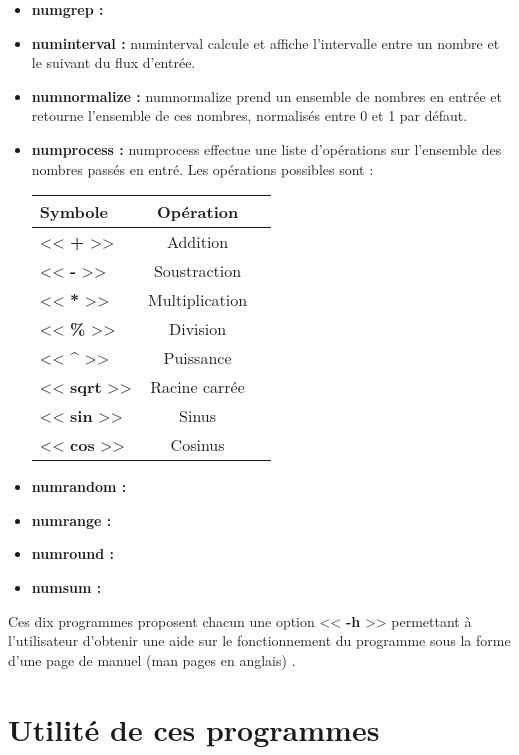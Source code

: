\begin{itemize}
 \item[\textbullet] \textbf{numgrep :} 
 \newline
 \item[\textbullet] \textbf{numinterval :} numinterval calcule et affiche l'intervalle entre un nombre et le suivant du flux d'entr\'ee. 
 \newline
 \item[\textbullet] \textbf{numnormalize :} numnormalize prend un ensemble de nombres en entr\'ee et retourne l'ensemble de ces nombres, 
normalis\'es entre 0 et 1 par d\'efaut.
 \newline
 \item[\textbullet] \textbf{numprocess :} numprocess effectue une liste d'op\'erations sur l'ensemble des nombres pass\'es en entr\'e.
Les op\'erations possibles sont :
\newline
\newline
\begin{tabular}{|l|c|r|}
  \hline
  Symbole &  Op\'eration\\
  \hline
  << \textbf{+} >> & Addition \\
  << \textbf{-} >> & Soustraction \\
  << \textbf{*} >> & Multiplication \\
  << \textbf{\%} >> & Division \\
  << \textbf{\^} >> & Puissance \\
  << \textbf{sqrt} >> & Racine carr\'ee \\
  << \textbf{sin} >> & Sinus \\
  << \textbf{cos} >> & Cosinus \\
  \hline
\end{tabular}
\newline
 \item[\textbullet] \textbf{numrandom :}
 \newline
 \item[\textbullet] \textbf{numrange :}
 \newline
 \item[\textbullet] \textbf{numround :}
 \newline
 \item[\textbullet] \textbf{numsum :}
 \newline
\end{itemize}

Ces dix programmes proposent chacun une option << \textbf{-h} >> permettant \`a l'utilisateur d'obtenir une aide sur le fonctionnement du 
programme sous la forme d'une page de manuel (man pages en anglais) .

\section{Utilit\'e de ces programmes}

